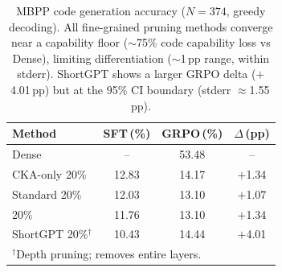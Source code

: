 \begin{table}[h]
\centering
\small
\caption{MBPP code generation accuracy ($N{=}374$, greedy decoding). All fine-grained pruning methods converge near a capability floor (${\sim}$75\% code capability loss vs Dense), limiting differentiation (${\sim}$1\,pp range, within stderr). ShortGPT shows a larger GRPO delta ($+$4.01\,pp) but at the 95\% CI boundary (stderr ${\approx}$1.55\,pp).}
\label{tab:mbpp}
\begin{tabular}{@{}lccc@{}}
\toprule
Method & SFT\,(\%) & GRPO\,(\%) & $\Delta$\,(pp) \\
\midrule
Dense & -- & 53.48 & -- \\
\midrule
CKA-only 20\% & 12.83 & 14.17 & $+$1.34 \\
Standard 20\% & 12.03 & 13.10 & $+$1.07 \\
\rasp{} 20\% & 11.76 & 13.10 & $+$1.34 \\
\midrule
ShortGPT 20\%$^\dagger$ & 10.43 & 14.44 & $+$4.01 \\
\bottomrule
\multicolumn{4}{l}{\footnotesize $^\dagger$Depth pruning; removes entire layers.}
\end{tabular}
\end{table}
